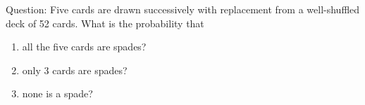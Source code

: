 \documentclass[journal,12pt,twocolumn]{IEEEtran}
\theoremstyle{remark}
\begin{document}



\maketitle

\newpage


\bigskip

\renewcommand{\thefigure}{\theenumi}
\renewcommand{\thetable}{\theenumi}

%


Question: Five cards are drawn successively with replacement from a well-shuffled deck of 52 cards. What is the probability that
\begin{enumerate}[label=(\alph*)]
\item all the five cards are spades?
\item only 3 cards are spades?
\item none is a spade?
\end{enumerate}
\end{document}
